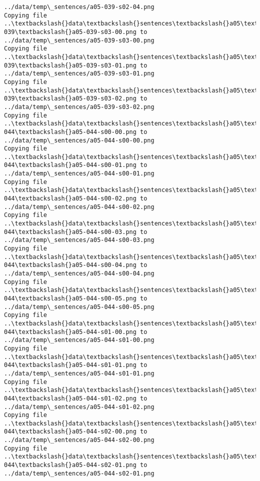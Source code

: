\documentclass[11pt]{article}
\begin{document}
\begin{Verbatim}[commandchars=\\\{\}]
../data/temp\_sentences/a05-039-s02-04.png
Copying file ..\textbackslash{}data\textbackslash{}sentences\textbackslash{}a05\textbackslash{}a05-039\textbackslash{}a05-039-s03-00.png to
../data/temp\_sentences/a05-039-s03-00.png
Copying file ..\textbackslash{}data\textbackslash{}sentences\textbackslash{}a05\textbackslash{}a05-039\textbackslash{}a05-039-s03-01.png to
../data/temp\_sentences/a05-039-s03-01.png
Copying file ..\textbackslash{}data\textbackslash{}sentences\textbackslash{}a05\textbackslash{}a05-039\textbackslash{}a05-039-s03-02.png to
../data/temp\_sentences/a05-039-s03-02.png
Copying file ..\textbackslash{}data\textbackslash{}sentences\textbackslash{}a05\textbackslash{}a05-044\textbackslash{}a05-044-s00-00.png to
../data/temp\_sentences/a05-044-s00-00.png
Copying file ..\textbackslash{}data\textbackslash{}sentences\textbackslash{}a05\textbackslash{}a05-044\textbackslash{}a05-044-s00-01.png to
../data/temp\_sentences/a05-044-s00-01.png
Copying file ..\textbackslash{}data\textbackslash{}sentences\textbackslash{}a05\textbackslash{}a05-044\textbackslash{}a05-044-s00-02.png to
../data/temp\_sentences/a05-044-s00-02.png
Copying file ..\textbackslash{}data\textbackslash{}sentences\textbackslash{}a05\textbackslash{}a05-044\textbackslash{}a05-044-s00-03.png to
../data/temp\_sentences/a05-044-s00-03.png
Copying file ..\textbackslash{}data\textbackslash{}sentences\textbackslash{}a05\textbackslash{}a05-044\textbackslash{}a05-044-s00-04.png to
../data/temp\_sentences/a05-044-s00-04.png
Copying file ..\textbackslash{}data\textbackslash{}sentences\textbackslash{}a05\textbackslash{}a05-044\textbackslash{}a05-044-s00-05.png to
../data/temp\_sentences/a05-044-s00-05.png
Copying file ..\textbackslash{}data\textbackslash{}sentences\textbackslash{}a05\textbackslash{}a05-044\textbackslash{}a05-044-s01-00.png to
../data/temp\_sentences/a05-044-s01-00.png
Copying file ..\textbackslash{}data\textbackslash{}sentences\textbackslash{}a05\textbackslash{}a05-044\textbackslash{}a05-044-s01-01.png to
../data/temp\_sentences/a05-044-s01-01.png
Copying file ..\textbackslash{}data\textbackslash{}sentences\textbackslash{}a05\textbackslash{}a05-044\textbackslash{}a05-044-s01-02.png to
../data/temp\_sentences/a05-044-s01-02.png
Copying file ..\textbackslash{}data\textbackslash{}sentences\textbackslash{}a05\textbackslash{}a05-044\textbackslash{}a05-044-s02-00.png to
../data/temp\_sentences/a05-044-s02-00.png
Copying file ..\textbackslash{}data\textbackslash{}sentences\textbackslash{}a05\textbackslash{}a05-044\textbackslash{}a05-044-s02-01.png to
../data/temp\_sentences/a05-044-s02-01.png

\end{Verbatim}
\end{document}
